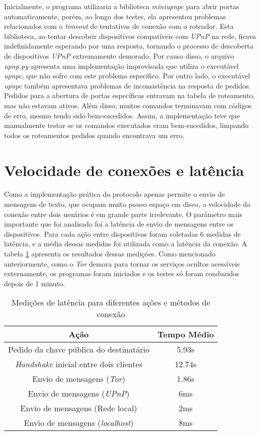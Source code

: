 Inicialmente, o programa utilizaria a biblioteca \textit{miniupnpc} para abrir portas automaticamente, porém, ao longo dos testes, ela apresentou problemas relacionados com o \textit{timeout} de tentativas de conexão com o roteador. Esta biblioteca, ao tentar descobrir dispositivos compatíveis com \textit{UPnP} na rede, ficava indefinidamente esperando por uma resposta, tornando o processo de descoberta de dispositivos \textit{UPnP} extremamente demorado. Por causa disso, o arquivo \textit{upnp.py} apresenta uma implementação improvisada que utiliza o executável \textit{upnpc}, que não sofre com este problema específico. Por outro lado, o executável \textit{upnpc} também apresentava problemas de inconsistência na resposta de pedidos. Pedidos para a abertura de portas específicas entravam na tabela de roteamento, mas não estavam ativos. Além disso, muitos comandos terminavam com códigos de erro, mesmo tendo sido bem-sucedidos. Assim, a implementação teve que manualmente testar se os comandos executados eram bem-sucedidos, limpando todos os roteamentos pedidos quando encontrava um erro.

\section{Velocidade de conexões e latência}

Como a implementação prática do protocolo apenas permite o envio de mensagens de texto, que ocupam muito pouco espaço em disco, a velocidade da conexão entre dois usuários é em grande parte irrelevante. O parâmetro mais importante que foi analisado foi a latência de envio de mensagens entre os dispositivos. Para cada ação entre dispositivos foram coletadas 6 medidas de latência, e a média dessas medidas foi utilizada como a latência da conexão. A tabela \ref{tab:latencia} apresenta os resultados dessas medições. Como mencionado anteriormente, como o \textit{Tor} demora para tornar os serviços ocultos acessíveis externamente, os programas foram iniciados e os testes só foram conduzidos depois de 1 minuto.

\begin{table}[H]
\centering
\begin{tabular}{|c|c|}
\hline
\textbf{Ação} & \textbf{Tempo Médio} \\ \hline
Pedido da chave pública do destinatário & 5.93s \\ \hline
\textit{Handshake} inicial entre dois clientes & 12.74s \\ \hline
Envio de mensagens (\textit{Tor}) & 1.86s \\ \hline
Envio de mensagens (\textit{UPnP}) & 6ms \\ \hline
Envio de mensagens (Rede local) & 2ms \\ \hline
Envio de mensagens (\textit{localhost}) & 8ms \\ \hline
\end{tabular}
\caption{Medições de latência para diferentes ações e métodos de conexão}
\label{tab:latencia}
\end{table}

